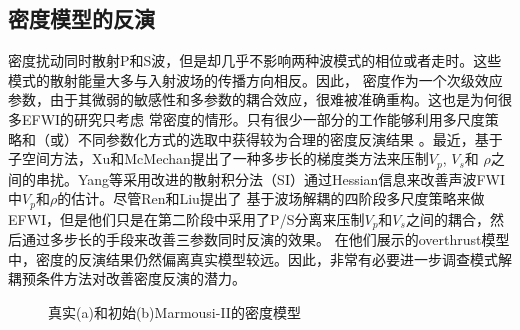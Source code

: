 \subsection{密度模型的反演}
密度扰动同时散射P和S波，但是却几乎不影响两种波模式的相位或者走时。这些模式的散射能量大多与入射波场的传播方向相反\cite[]{wu.aki:1985,tarantola:1986}。因此，
密度作为一个次级效应参数，由于其微弱的敏感性和多参数的耦合效应\cite[]{tarantola:1986,forgues.lambare:1997}，很难被准确重构。这也是为何很多EFWI的研究只考虑
常密度的情形\cite[]{shipp:2002,sears2008,brossier2009}。只有很少一部分的工作能够利用多尺度策略和（或）不同参数化方式的选取中获得较为合理的密度反演结果
\cite{jeong2012full}。最近，基于子空间方法\cite[]{kennett:1988}，Xu和McMechan\cite{xu.mcmechan:2014}提出了一种多步长的梯度类方法来压制$V_p$, $V_s$和
$\rho$之间的串扰。Yang等\cite{Yang2016}采用改进的散射积分法（SI）通过Hessian信息来改善声波FWI中$V_p$和$\rho$的估计。尽管Ren和Liu\cite{ren.liu:2016}提出了
基于波场解耦的四阶段多尺度策略来做EFWI，但是他们只是在第二阶段中采用了P/S分离来压制$V_p$和$V_s$之间的耦合，然后通过多步长的手段来改善三参数同时反演的效果。
在他们展示的overthrust模型中，密度的反演结果仍然偏离真实模型较远。因此，非常有必要进一步调查模式解耦预条件方法对改善密度反演的潜力。
\begin{figure}
    \begin{center}
    \caption{
		真实(a)和初始(b)Marmousi-II的密度模型
    }
    \label{fig:Marrho}
    \end{center}
\end{figure}

